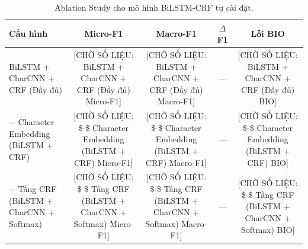 \begin{table}[t]
\centering
\small
\begin{tabular}{lcccc}
\hline
\textbf{Cấu hình} & \textbf{Micro-F1} & \textbf{Macro-F1} & \textbf{$\Delta$F1} & \textbf{Lỗi BIO} \\
\hline
BiLSTM + CharCNN + CRF (Đầy đủ) & [CHỜ SỐ LIỆU: BiLSTM + CharCNN + CRF (Đầy đủ) Micro-F1] & [CHỜ SỐ LIỆU: BiLSTM + CharCNN + CRF (Đầy đủ) Macro-F1] & — & [CHỜ SỐ LIỆU: BiLSTM + CharCNN + CRF (Đầy đủ) BIO] \\
  $-$ Character Embedding (BiLSTM + CRF) & [CHỜ SỐ LIỆU:   \$-\$ Character Embedding (BiLSTM + CRF) Micro-F1] & [CHỜ SỐ LIỆU:   \$-\$ Character Embedding (BiLSTM + CRF) Macro-F1] & — & [CHỜ SỐ LIỆU:   \$-\$ Character Embedding (BiLSTM + CRF) BIO] \\
  $-$ Tầng CRF (BiLSTM + CharCNN + Softmax) & [CHỜ SỐ LIỆU:   \$-\$ Tầng CRF (BiLSTM + CharCNN + Softmax) Micro-F1] & [CHỜ SỐ LIỆU:   \$-\$ Tầng CRF (BiLSTM + CharCNN + Softmax) Macro-F1] & — & [CHỜ SỐ LIỆU:   \$-\$ Tầng CRF (BiLSTM + CharCNN + Softmax) BIO] \\
\hline
\end{tabular}
\caption{Ablation Study cho mô hình BiLSTM-CRF tự cài đặt.}
\label{tab:ablation_bilstm}
\end{table}
